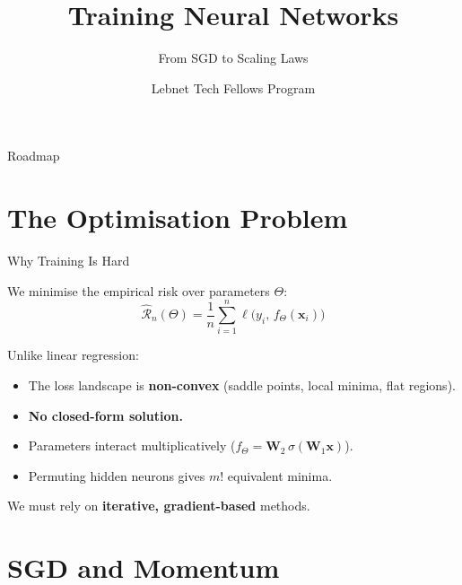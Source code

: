 \documentclass[aspectratio=169, professionalfonts]{beamer}
\title{Training Neural Networks}
\subtitle{From SGD to Scaling Laws}
\author{Lebnet Tech Fellows Program}
\date{}
\begin{document}
\begin{frame}
\titlepage
\end{frame}

\begin{frame}{Roadmap}
\tableofcontents
\end{frame}

\section{The Optimisation Problem}

\begin{frame}{Why Training Is Hard}

We minimise the empirical risk over parameters $\Theta$:
$$\hat{\mathcal{R}}_n(\Theta)
  = \frac{1}{n}\sum_{i=1}^{n}
    \ell\!\bigl(y_i,\, f_\Theta(\mathbf{x}_i)\bigr)$$

\bigskip

Unlike linear regression:
\begin{itemize}
  \item The loss landscape is \textbf{non-convex}
        (saddle points, local minima, flat regions).
  \item \textbf{No closed-form solution.}
  \item Parameters interact multiplicatively
        ($f_\Theta = \mathbf{W}_2\,\sigma(\mathbf{W}_1\mathbf{x})$).
  \item Permuting hidden neurons gives $m!$ equivalent minima.
\end{itemize}

\bigskip

We must rely on \textbf{iterative, gradient-based} methods.

\end{frame}

\section{SGD and Momentum}
\end{document}
